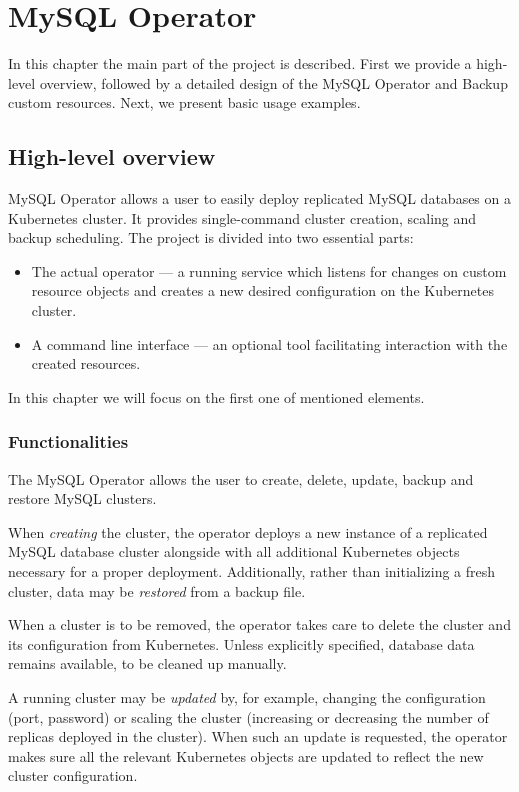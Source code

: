 \chapter{MySQL Operator}

In this chapter the main part of the project is described. First we provide 
a high-level overview, followed by a detailed design of the MySQL Operator 
and Backup custom resources. Next, we present basic usage examples.

\section{High-level overview}
MySQL Operator allows a user to easily deploy replicated MySQL databases on a Kubernetes cluster.
It provides single-command cluster creation, scaling and backup scheduling. The project is divided
into two essential parts:
\begin{itemize}
	\item The actual operator --- a running service which listens for changes on custom resource
	objects and creates a new desired configuration on the Kubernetes cluster.
	\item A command line interface --- an optional tool facilitating interaction with the created
	resources.
\end{itemize}

In this chapter we will focus on the first one of mentioned elements.

\subsection{Functionalities}
The MySQL Operator allows the user to create, delete, update, backup and restore MySQL clusters.

When \textit{creating} the cluster, the operator deploys a new instance of a replicated MySQL
database cluster alongside with all additional Kubernetes objects necessary for a proper deployment.
Additionally, rather than initializing a fresh cluster, data may be \textit{restored} from a backup file.

When a cluster is to be removed, the operator takes care to delete the cluster and its
configuration from Kubernetes. Unless explicitly specified, database data remains available, to be
cleaned up manually.

A running cluster may be \textit{updated} by, for example, changing the configuration (port,
password) or scaling the cluster (increasing or decreasing the number of replicas deployed in the
cluster). When such an update is requested, the operator makes sure all the relevant Kubernetes
objects are updated to reflect the new cluster configuration.

